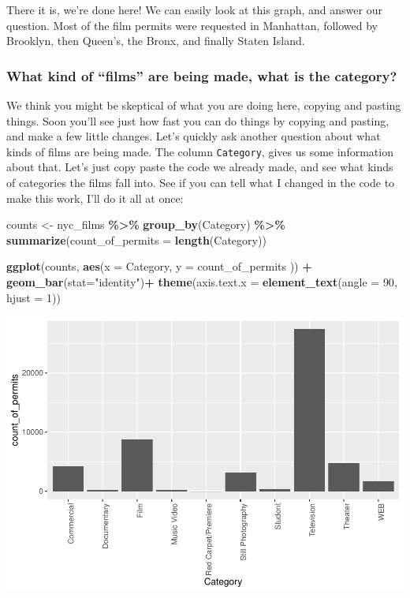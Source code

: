 \documentclass[
]{book}
\newenvironment{Shaded}{\begin{snugshade}}{\end{snugshade}}
\newcommand{\AttributeTok}[1]{\textcolor[rgb]{0.13,0.29,0.53}{#1}}
\newcommand{\DecValTok}[1]{\textcolor[rgb]{0.00,0.00,0.81}{#1}}
\newcommand{\FunctionTok}[1]{\textcolor[rgb]{0.13,0.29,0.53}{\textbf{#1}}}
\newcommand{\NormalTok}[1]{#1}
\newcommand{\OtherTok}[1]{\textcolor[rgb]{0.56,0.35,0.01}{#1}}
\newcommand{\SpecialCharTok}[1]{\textcolor[rgb]{0.81,0.36,0.00}{\textbf{#1}}}
\newcommand{\StringTok}[1]{\textcolor[rgb]{0.31,0.60,0.02}{#1}}
\begin{document}
There it is, we're done here! We can easily look at this graph, and answer our question. Most of the film permits were requested in Manhattan, followed by Brooklyn, then Queen's, the Bronx, and finally Staten Island.

\hypertarget{what-kind-of-films-are-being-made-what-is-the-category}{%
\subsubsection{What kind of ``films'' are being made, what is the category?}\label{what-kind-of-films-are-being-made-what-is-the-category}}

We think you might be skeptical of what you are doing here, copying and pasting things. Soon you'll see just how fast you can do things by copying and pasting, and make a few little changes. Let's quickly ask another question about what kinds of films are being made. The column \texttt{Category}, gives us some information about that. Let's just copy paste the code we already made, and see what kinds of categories the films fall into. See if you can tell what I changed in the code to make this work, I'll do it all at once:

\begin{Shaded}
\begin{Highlighting}[]
\NormalTok{counts }\OtherTok{\textless{}{-}}\NormalTok{ nyc\_films }\SpecialCharTok{\%\textgreater{}\%}
          \FunctionTok{group\_by}\NormalTok{(Category) }\SpecialCharTok{\%\textgreater{}\%}
          \FunctionTok{summarize}\NormalTok{(}\AttributeTok{count\_of\_permits =} \FunctionTok{length}\NormalTok{(Category))}

\FunctionTok{ggplot}\NormalTok{(counts, }\FunctionTok{aes}\NormalTok{(}\AttributeTok{x =}\NormalTok{ Category, }\AttributeTok{y =}\NormalTok{ count\_of\_permits )) }\SpecialCharTok{+}
  \FunctionTok{geom\_bar}\NormalTok{(}\AttributeTok{stat=}\StringTok{"identity"}\NormalTok{)}\SpecialCharTok{+} 
  \FunctionTok{theme}\NormalTok{(}\AttributeTok{axis.text.x =} \FunctionTok{element\_text}\NormalTok{(}\AttributeTok{angle =} \DecValTok{90}\NormalTok{, }\AttributeTok{hjust =} \DecValTok{1}\NormalTok{))}
\end{Highlighting}
\end{Shaded}

\includegraphics{Statistics_Lab_files/figure-latex/1category-1.pdf}
\end{document}
